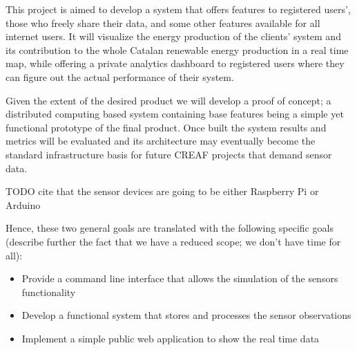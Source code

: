 This project is aimed to develop a system that offers features to registered users’, those who freely share their data, and some other features available for all internet users. It will visualize the energy production of the clients’ system and its contribution to the whole Catalan renewable energy production in a real time map, while offering a private analytics dashboard to registered users where they can figure out the actual performance of their system.

Given the extent of the desired product we will develop a proof of concept; a distributed computing based system containing base features being a simple yet functional prototype of the final product. Once built the system results and metrics will be evaluated and its architecture may eventually become the standard infrastructure basis for future CREAF projects that demand sensor data.

TODO cite that the sensor devices are going to be either Raspberry Pi or Arduino

Hence, these two general goals are translated with the following specific goals (describe further the fact that we have a reduced scope; we don't have time for all):

\begin{itemize}
	\item Provide a command line interface that allows the simulation of the sensors functionality
	\item Develop a functional system that stores and processes the sensor observations
	\item Implement a simple public web application to show the real time data
\end{itemize}


